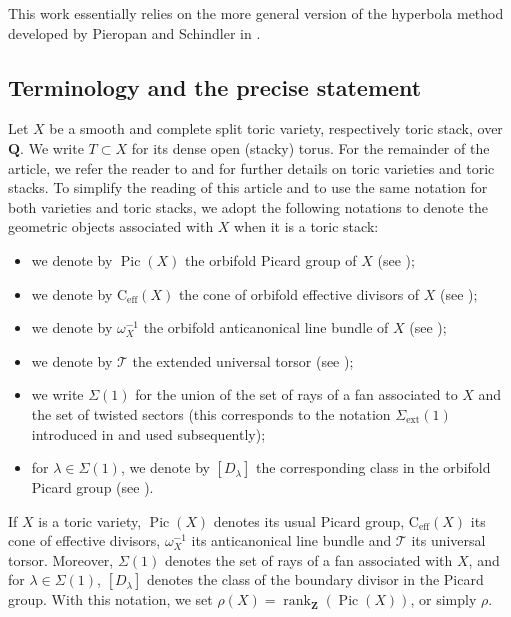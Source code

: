 \documentclass{proc-l}
\newcommand{\Z}{\mathbf{Z}}
\newcommand{\Q}{\mathbf{Q}}
\newcommand{\cone}{\text{C}_{\text{eff}}(X)}
\DeclareMathOperator{\Pic}{Pic}
\DeclareMathOperator{\rank}{rank}
\newcommand{\stackT}{\mathcal{T}}
\newcommand{\w}{\omega}
\theoremstyle{definition}
\theoremstyle{remark}
\numberwithin{equation}{section}
\begin{document}
This work essentially relies on the more general version of the hyperbola method developed by  Pieropan and Schindler in \cite[Section 4]{pieropan_hyperbola_method}.


\subsection{Terminology and the precise statement}





Let $X$ be a smooth and complete split toric variety, respectively toric stack, over $\Q$. We write $T \subset X$ for its dense open (stacky) torus. For the remainder of the article, we refer the reader to \cite[Section 2.3]{bongiorno2024multiheightanalysisrationalpoints} and \cite[Section 5]{bongiorno_toric_stacks} for further details on toric varieties and toric stacks. To simplify the reading of this article and to use the same notation for both varieties and toric stacks, we adopt the following notations to denote the geometric objects associated with $X$ when it is a toric stack:
\begin{itemize}
    \item we denote by $\Pic(X)$ the orbifold Picard group of $X$ (see \cite[Definition 3.7]{bongiorno_toric_stacks});
    \item we denote by $\cone$ the cone of orbifold effective divisors of $X$ (see \cite[Definition 3.17]{bongiorno_toric_stacks});
    \item we denote by $\w_X^{-1}$ the orbifold anticanonical line bundle of $X$ (see \cite[Definition 3.14]{bongiorno_toric_stacks});
    \item we denote by $\stackT$ the extended universal torsor (see \cite[Definition 5.34, Definition 6.1]{bongiorno_toric_stacks});
    \item we write $\Sigma(1)$ for the union of the set of rays of a fan associated to $X$ and the set of twisted sectors
(this corresponds to the notation $\Sigma_{\mathrm{ext}}(1)$ introduced
in \cite[Notations 5.33]{bongiorno_toric_stacks} and used subsequently);
    \item for $\lambda \in \Sigma(1)$, we denote by $[D_\lambda]$ the corresponding class in the orbifold Picard group (see \cite[Notation 3.9,5.26,5.38]{bongiorno_toric_stacks}).
\end{itemize}If $X$ is a toric variety, $\Pic(X)$ denotes its usual Picard group, $\cone$ its cone of effective divisors, $\w_X^{-1}$ its anticanonical line bundle and $\stackT$ its universal torsor. Moreover, $\Sigma(1)$ denotes the set of rays of a fan associated with $X$,
and for $\lambda \in \Sigma(1)$, $[D_\lambda]$ denotes the class of the
boundary divisor in the Picard group.
With this notation, we set $\rho(X) = \rank_{\Z}( \Pic(X) ) $, or simply $\rho$.
\end{document}
